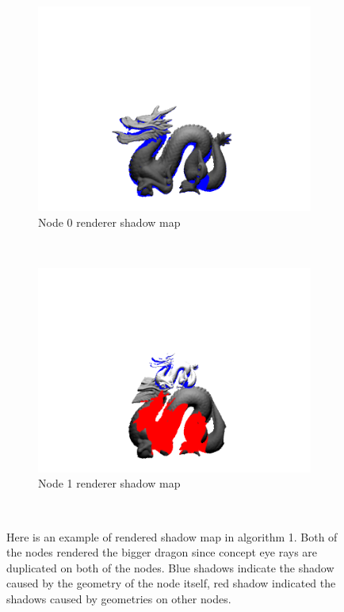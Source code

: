 \documentclass[a4paper, oneside, 10pt]{article}
\begin{document}
\begin{figure}[h]
	\centering
        \begin{subfigure}[b]{0.5\textwidth}
                \includegraphics[width=\textwidth]{shadow0}
                \caption{Node 0 renderer shadow map}
                \label{fig:shadow0}
        \end{subfigure}%
        ~ %
        \begin{subfigure}[b]{0.5\textwidth}
                \includegraphics[width=\textwidth]{shadow1}
                \caption{Node 1 renderer shadow map}
                \label{fig:shadow1}
        \end{subfigure}
  		\caption{Here is an example of rendered shadow map in algorithm 1. Both of the nodes rendered the bigger dragon since concept eye rays are duplicated on both of the nodes. Blue shadows indicate the shadow caused by the geometry of the node itself, red shadow indicated the shadows caused by geometries on other nodes.}\
\end{figure}


\end{document}
